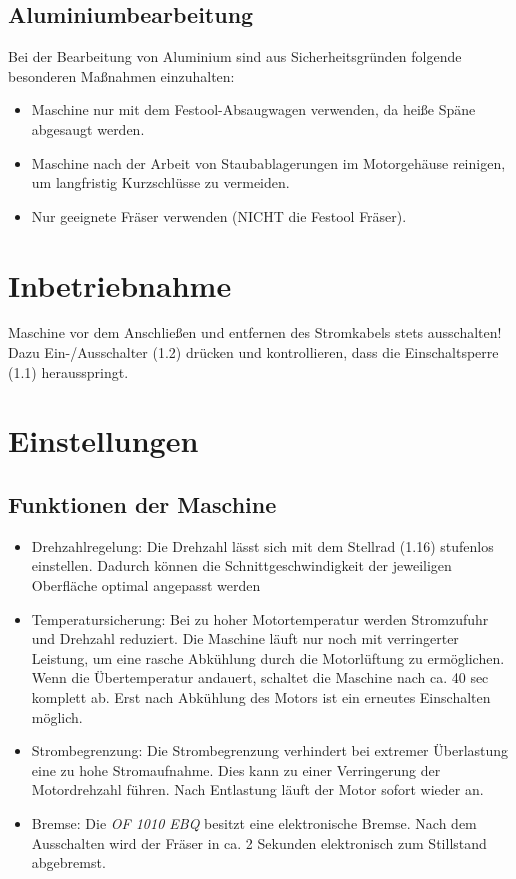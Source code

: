 \documentclass{\basedir/fablab-document}
\begin{document}
\subsection{Aluminiumbearbeitung}
Bei der Bearbeitung von Aluminium sind aus Sicherheitsgründen folgende besonderen Maßnahmen einzuhalten:
\begin{itemize}
\item Maschine nur mit dem Festool-Absaugwagen verwenden, da heiße Späne abgesaugt werden.
\item Maschine nach der Arbeit von Staubablagerungen im Motorgehäuse reinigen, um langfristig Kurzschlüsse zu vermeiden.
\item Nur geeignete Fräser verwenden (NICHT die Festool Fräser).
\end{itemize}


\section{Inbetriebnahme}
Maschine vor dem Anschließen und entfernen des Stromkabels stets ausschalten! Dazu Ein-/Ausschalter (1.2) drücken und kontrollieren, dass die Einschaltsperre (1.1) herausspringt.

\section{Einstellungen}
\subsection{Funktionen der Maschine}
\begin{itemize}
\item Drehzahlregelung: Die Drehzahl lässt sich mit dem Stellrad (1.16) stufenlos einstellen. Dadurch können die Schnittgeschwindigkeit der jeweiligen Oberfläche optimal angepasst werden
\item Temperatursicherung: Bei zu hoher Motortemperatur werden Stromzufuhr und Drehzahl reduziert. Die Maschine läuft nur noch mit verringerter Leistung, um eine rasche Abkühlung durch die Motorlüftung zu ermöglichen. Wenn die Übertemperatur andauert, schaltet die Maschine nach ca. 40 sec komplett ab. Erst nach Abkühlung des Motors ist ein erneutes Einschalten möglich.
\item Strombegrenzung: Die Strombegrenzung verhindert bei extremer Überlastung eine zu hohe Stromaufnahme. Dies kann zu einer Verringerung der Motordrehzahl führen. Nach Entlastung läuft der Motor sofort wieder an.
\item Bremse: Die \textit{OF 1010 EBQ} besitzt eine elektronische Bremse. Nach dem Ausschalten wird der Fräser in ca. 2 Sekunden elektronisch zum Stillstand abgebremst.
\end{itemize}
\end{document}
